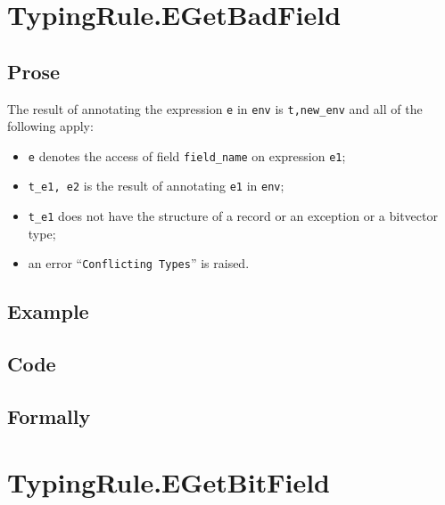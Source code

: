 \documentclass{book}
\begin{document}

\section{TypingRule.EGetBadField \label{sec:TypingRule.EGetBadField}}

 \subsection{Prose}
  The result of annotating the expression \texttt{e} in \texttt{env} is
\texttt{t,new\_env} and all of the following apply:
   \begin{itemize}
   \item \texttt{e} denotes the access of field \texttt{field\_name} on expression \texttt{e1};
   \item \texttt{t\_e1, e2} is the result of annotating \texttt{e1} in \texttt{env};
   \item \texttt{t\_e1} does not have the structure of a record or an exception or a bitvector type;
   \item an error ``\texttt{Conflicting Types}'' is raised.
   \end{itemize}

 \subsection{Example}

 \subsection{Code}

\begin{emptyformal}
    \subsection{Formally}
\end{emptyformal}


\section{TypingRule.EGetBitField \label{sec:TypingRule.EGetBitField}}
\end{document}
